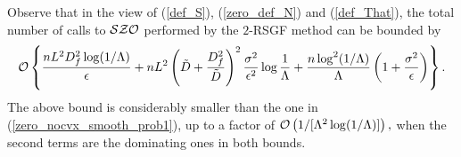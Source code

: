 \documentclass[final]{siamltex}
\newcommand{\beq}{\begin{equation}}
\newcommand{\eeq}{\end{equation}}
\def\eqnok#1{(\ref{#1})}
\def\vgap{\vspace*{.1in}}
\begin{document}
\vgap

Observe that in the view of \eqnok{def_S}, \eqnok{zero_def_N} and \eqnok{def_That},
the total number of calls to $\cal SZO$ performed by the $2$-RSGF method can be bounded by
\beq \label{zero_improved_compl}
{\cal O} \left\{
\frac{n  L^2 D_f^2
\log (1/\Lambda) }{\epsilon} + n L^2
 \left(\tilde D + \frac{D_f^2}{\tilde D}\right)^2 \frac{\sigma^2}{\epsilon^2} \log \frac{1}{\Lambda}
+ \frac{n \log^2(1/\Lambda)}{\Lambda} \left(1+ \frac{\sigma^2}{\epsilon}\right)
\right\}.
\eeq
The above bound is considerably smaller than the one in \eqnok{zero_nocvx_smooth_prob1},
up to a factor of
$
{\cal O}\left( 1/[\Lambda^2 \log(1/\Lambda)] \right),
$
when the second terms are the dominating ones in both bounds.

\end{document}
